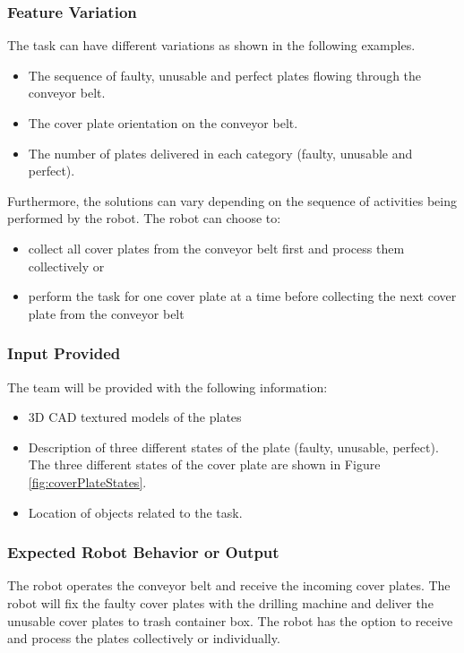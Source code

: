 \subsubsection{Feature Variation}
\label{sssec:TaskPlateDrillingVariation}


The task can have different variations as shown in the following examples.
\begin{itemize}
 \item The sequence of faulty, unusable and perfect plates flowing through the conveyor belt.
 \item The cover plate orientation on the conveyor belt.
 \item The number of plates delivered in each category (faulty, unusable and perfect).
\end{itemize}
Furthermore, the solutions can vary depending on the sequence of activities being performed by the robot. The robot can choose to:

\begin{itemize}
	\item collect all cover plates from the conveyor belt first and process them collectively or
	\item perform the task for one cover plate at a time before collecting the next cover plate from the conveyor belt
\end{itemize}


\subsubsection{Input Provided}
\label{sssec:TaskPlateDrillingInput}
The team will be provided with the following information:
\begin{itemize}
\item 3D CAD textured models of the plates
\item Description of three different states of the plate (faulty, unusable, perfect). 
The three different states of the cover plate are shown in Figure \ref{fig:coverPlateStates}.
\item Location of objects related to the task.
\end{itemize}

\subsubsection{Expected Robot Behavior or Output}
\label{sssec:TaskPlateDrillingOutput}
The robot operates the conveyor belt and receive the incoming cover plates. 
The robot will fix the faulty cover plates with the drilling machine and deliver the unusable cover plates to trash container box.
The robot has the option to receive and process the plates collectively or individually.

